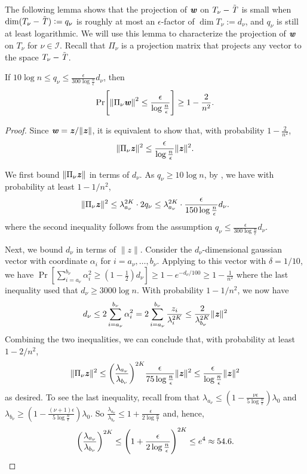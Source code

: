 The following lemma shows that the projection of $\boldsymbol{\mathit{w}}$ on $T_{\nu}-{\tilde{\mathit{T}}}$ is small when $\mathrm{dim} (T_\nu - {\tilde{\mathit{T}}}):= q_\nu$ is roughly at most an $\epsilon$-factor of $\dim{T_\nu}:= d_\nu$, and $q_\nu$ is still at least logarithmic.
We will use this lemma to characterize the projection of $\boldsymbol{\mathit{w}}$ on $T_{\nu}$ for $\nu \in \mathcal{I}$. 
Recall that $\Pi_\nu$ is a projection matrix that projects any vector to the space $T_{\nu}-{\tilde{\mathit{T}}}$.
\begin{lemma}\label{lem:GaussianProjD}

If $ 10 \log n \leq q_{\nu} \leq \frac{\epsilon}{300\log\frac{n}{\epsilon}}d_{\nu}$, then
\[
\Pr\left[\norm{\Pi_{\nu}\ww}^2 \leq \frac{\epsilon}{\log\frac{n}{\epsilon}} \right] \geq 1-\frac{2}{n^{2}}.
\]
\end{lemma}
\begin{proof}
Since $\boldsymbol{\mathit{w}}=\boldsymbol{\mathit{z}}/\|\boldsymbol{\mathit{z}}\|$, it is equivalent to show that, with probability $1-\frac{2}{n^{2}}$, $$\|\Pi_{\nu}\boldsymbol{\mathit{z}}\|^{2}\leq\frac{\epsilon}{\log\frac{n}{\epsilon}}\|\boldsymbol{\mathit{z}}\|^{2}.$$ 

We first bound $\|\Pi_\nu \boldsymbol{\mathit{z}}\|$ in terms of $d_\nu$. As $q_{\nu} \ge 10\log n$, by , we have with probability at least $1-1/n^{2}$, 
\[
\|\Pi_{\nu}\boldsymbol{\mathit{z}}\|^{2}\leq\lambda_{a_{\nu}}^{2K}\cdot2q_{\nu}\le\lambda_{a_{\nu}}^{2K}\cdot\frac{\epsilon}{150\log\frac{n}{\epsilon}}d_{\nu}.
\]
where the second inequality follows from the assumption $q_{\nu}\leq\frac{\epsilon}{300\log\frac{n}{\epsilon}}d_{\nu}$. 

Next, we bound $d_{\nu}$ in terms of $\|z\|$. Consider the $d_{\nu}$-dimensional gaussian vector with coordinate $\alpha_{i}$ for $i=a_{\nu},\dots,b_{\nu}$. Applying  to this vector with $\delta=1/10$, we have $\Pr[\sum_{i=a_{\nu}}^{b_{\nu}}\alpha_{i}^{2}\geq (1-\frac{1}{2})d_{\nu}]\geq1-e^{-d_{\nu}/100}\geq1-\frac{1}{n^{2}}$ where the last inequality used that $d_{\nu}\ge 3000\log n$. With probability $1-1/n^{2}$, we now have
\[
d_{\nu}\le2\sum_{i=a_{\nu}}^{b_{\nu}}\alpha_{i}^{2}=2\sum_{i=a_{\nu}}^{b_{\nu}}\frac{z_{i}}{\lambda_{i}^{2K}}\le\frac{2}{\lambda_{b_{\nu}}^{2K}}\|\boldsymbol{\mathit{z}}\|^{2}
\]
Combining the two inequalities, we can conclude that, with probability at least $1-2/n^{2}$, 
\[
\|\Pi_{\nu}\zz\|^{2}\le\left(\frac{\lambda_{a_{\nu}}}{\lambda_{b_{\nu}}}\right)^{2K}\frac{\epsilon}{75\log\frac{n}{\epsilon}}\|\zz\|^{2}\le\frac{\epsilon}{\log\frac{n}{\epsilon}}\|\zz\|^{2}
\]
as desired. To see the last inequality, recall from  that $\lambda_{a_{\nu}}\leq\left(1-\frac{\nu\epsilon}{5\log\frac{n}{\epsilon}}\right)\lambda_{0}$ and $\lambda_{b_{\nu}}\geq\left(1-\frac{(\nu+1)\epsilon}{5\log\frac{n}{\epsilon}}\right)\lambda_{0}$. So $\frac{\lambda_{a_{\nu}}}{\lambda_{b_{\nu}}}\le1+\frac{\epsilon}{2\log\frac{n}{\epsilon}}$ and, hence, 
\[
\left(\frac{\lambda_{a_{\nu}}}{\lambda_{b_{\nu}}}\right)^{2K}\leq\left(1+\frac{\epsilon}{2\log\frac{n}{\epsilon}}\right)^{2K}\le e^{4}\approx54.6. \qedhere
\]
\end{proof}

